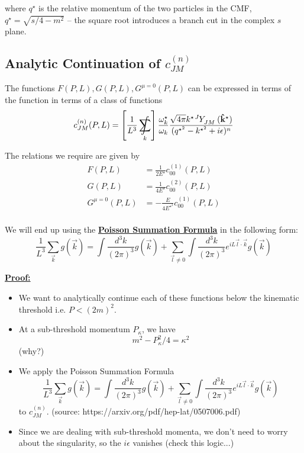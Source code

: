\documentclass{article}
\DeclareMathOperator*{\SumInt}{%
\mathchoice%
  {\ooalign{$\displaystyle\sum$\cr\hidewidth$\displaystyle\int$\hidewidth\cr}}
  {\ooalign{\raisebox{.14\height}{\scalebox{.7}{$\textstyle\sum$}}\cr\hidewidth$\textstyle\int$\hidewidth\cr}}
  {\ooalign{\raisebox{.2\height}{\scalebox{.6}{$\scriptstyle\sum$}}\cr$\scriptstyle\int$\cr}}
  {\ooalign{\raisebox{.2\height}{\scalebox{.6}{$\scriptstyle\sum$}}\cr$\scriptstyle\int$\cr}}
}
\begin{document}
where $q^{\star}$ is the relative momentum of the two particles in the CMF, $q^{\star} = \sqrt{s/4 - m^2}$ -- the square root introduces a branch cut in the complex $s$ plane.

\subsection{Analytic Continuation of $c_{JM}^{(n)}$}

The functions $F(P, L), G(P, L), G^{\mu = 0}(P, L)$ can be expressed in terms of the function in terms of a class of functions 
\[ c^{(n)}_{JM}(P, L) = \left[ \frac{1}{L^3} \SumInt_k \right] \frac{\omega_k^{\star}}{\omega_{k}} \frac{\sqrt{4\pi} k^{\star} \tensor[^J]{Y}{_{JM}} (\mathbf{\hat{k}}^{\star}) }{(q^{\star^{2}} - k^{\star^{2}} + i\epsilon)^n } \]

The relations we require are given by 
\begin{align*}
  F(P, L) &= \frac{1}{2E^{\star}} c_{00}^(1)(P, L) \\
  G(P, L) &= \frac{1}{4E^{\star}} c_{00}^(2)(P, L) \\
  G^{\mu = 0}(P, L) &= -\frac{E}{4E^{\star^{3}}} c_{00}^(1)(P, L) \\
\end{align*}

\vskip 0.5cm
\begin{dottedbox}
  We will end up using the \underline{\textbf{Poisson Summation Formula}} in the following form:
  \[ \frac{1}{L^3} \sum_{\vec{k}} g(\vec{k}) = \int \frac{d^3 k}{(2\pi)^3} g(\vec{k}) + \sum_{\vec{l} \neq 0} \int \frac{d^3 k}{(2\pi)^3} e^{i L \vec{l} \cdot \vec{k}} g(\vec{k}) \]

  \vskip 0.5cm
  \underline{\textbf{Proof:}}
\end{dottedbox}

\vskip 0.5cm

\begin{itemize}
  \item We want to analytically continue each of these functions below the kinematic threshold i.e. $P < (2m)^2$.
  
  \item At a sub-threshold momentum $P_{\kappa}$, we have 
  \[ m^2 - P_{\kappa}^2/4 = \kappa^2 \] (why?)

  \item We apply the Poisson Summation Formula 
  \[ \boxed{ \frac{1}{L^3} \sum_{\vec{k}} g(\vec{k}) = \int \frac{d^3 k}{(2\pi)^3} g(\vec{k}) + \sum_{\vec{l} \neq 0} \int \frac{d^3 k}{(2\pi)^3} e^{i L \vec{l} \cdot \vec{k}} g(\vec{k}) } \]
  to $c_{JM}^{(n)}$.
  (source: https://arxiv.org/pdf/hep-lat/0507006.pdf)
  
  \item Since we are dealing with sub-threshold momenta, we don't need to worry about the singularity, so the $i \epsilon$ vanishes (check this logic...)
\end{itemize}
\end{document}
